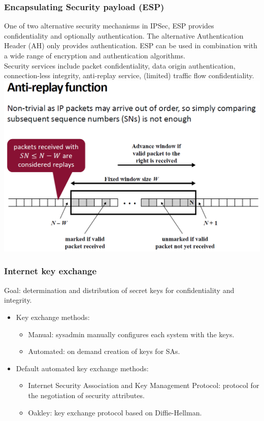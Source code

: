 \documentclass[12pt]{article}
\begin{document}
 \subsubsection{Encapsulating Security payload (ESP)}
 One of two alternative security mechanisms in IPSec, ESP provides confidentiality and optionally authentication. The alternative Authentication Header (AH) only provides authentication. ESP can be used in combination with a wide range of encryption and authentication algorithms. \\
 Security services include packet confidentiality, data origin authentication, connection-less integrity, anti-replay service, (limited) traffic flow confidentiality.\\
 \includegraphics[width=0.8\linewidth]{./slides/L6P5ARF.PNG}
 
 \subsubsection{Internet key exchange}
 Goal: determination and distribution of secret keys for confidentiality and integrity.
 \begin{itemize}
 	\item Key exchange methods:
 	\begin{itemize}
 		\item Manual: sysadmin manually configures each system with the keys.
 		\item Automated: on demand creation of keys for SAs.
 	\end{itemize}
 \item Default automated key exchange methods:
 \begin{itemize}
 	\item Internet Security Association and Key Management Protocol: protocol for the negotiation of security attributes.
 	\item Oakley: key exchange protocol based on Diffie-Hellman.
 \end{itemize}
 \end{itemize}
  
\end{document}
